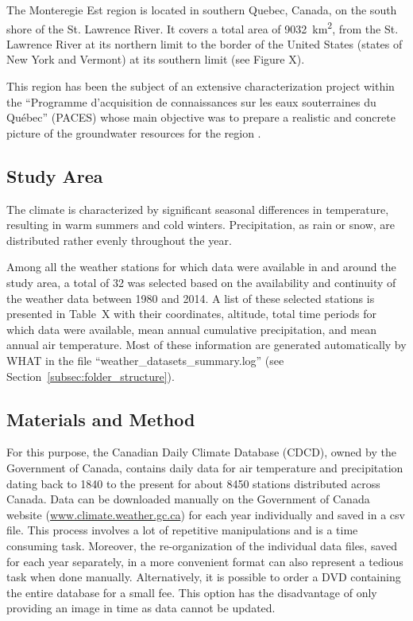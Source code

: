 \documentclass[TechnicalNoteMeteo.tex]{subfiles}
\begin{document}
The Monteregie Est region is located in southern Quebec, Canada, on the south shore of the St. Lawrence River. It covers a total area of 9032~km\textsuperscript{2}, from the St. Lawrence River at its northern limit to the border of the United States (states of New York and Vermont) at its southern limit (see Figure X).

This region has been the subject of an extensive characterization project within the ``Programme d'acquisition de connaissances sur les eaux souterraines du Québec'' (PACES) whose main objective was to prepare a realistic and concrete picture of the groundwater resources for the region \citep{carrier_portrait_2013}.

\subsection{Study Area}

The climate is characterized by significant seasonal differences in temperature, resulting in warm summers and cold winters. Precipitation, as rain or snow, are distributed rather evenly throughout the year.

Among all the weather stations for which data were available in and around the study area, a total of 32 was selected based on the availability and continuity of the weather data between 1980 and 2014. A list of these selected stations is presented in Table~X with their coordinates, altitude, total time periods for which data were available, mean annual cumulative precipitation, and mean annual air temperature. Most of these information are generated automatically by WHAT in the file ``weather\_datasets\_summary.log'' (see Section~\ref{subsec:folder_structure}).

\subsection{Materials and Method}


For this purpose, the Canadian Daily Climate Database (CDCD), owned by the Government of Canada, contains daily data for air temperature and precipitation dating back to 1840 to the present for about 8450 stations distributed across Canada. Data can be downloaded manually on the Government of Canada website (\url{www.climate.weather.gc.ca}) for each year individually and saved in a csv file. This process involves a lot of repetitive manipulations and is a time consuming task. Moreover, the re-organization of the individual data files, saved for each year separately, in a more convenient format can also represent a tedious task when done manually. Alternatively, it is possible to order a DVD containing the entire database for a small fee. This option has the disadvantage of only providing an image in time as data cannot be updated.  
\end{document}
